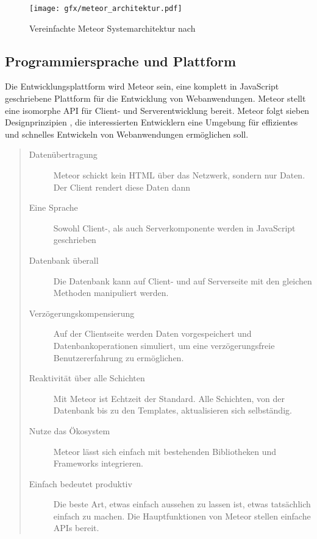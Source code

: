 \begin{figure}[h]
  \texttt{[image: gfx/meteor\_architektur.pdf]}
  \caption{Vereinfachte Meteor Systemarchitektur nach \cite{meteor-architecture}}
  \label{fig:MeteorArchitektur}
\end{figure}

\subsection{Programmiersprache und Plattform}

Die Entwicklungsplattform wird Meteor sein, eine komplett in JavaScript
geschriebene Plattform für die Entwicklung von Webanwendungen. Meteor stellt
eine isomorphe API für Client- und Serverentwicklung bereit. Meteor folgt sieben
Designprinzipien \cite{meteor-7}, die interessierten Entwicklern eine Umgebung
für effizientes und schnelles Entwickeln von Webanwendungen ermöglichen soll.

\begin{quotation}

  \begin{description}

    \item[Datenübertragung]{Meteor schickt kein HTML über das Netzwerk, sondern
    nur Daten. Der Client rendert diese Daten dann}

    \item[Eine Sprache]{Sowohl Client-, als auch Serverkomponente werden in
    JavaScript geschrieben}

    \item[Datenbank überall]{Die Datenbank kann auf Client- und auf Serverseite
    mit den gleichen Methoden manipuliert werden.}

    \item[Verzögerungskompensierung]{Auf der Clientseite werden Daten
    vorgespeichert und Datenbankoperationen simuliert, um eine verzögerungsfreie
    Benutzererfahrung zu ermöglichen.}

    \item[Reaktivität über alle Schichten]{Mit Meteor ist Echtzeit der Standard.
    Alle Schichten, von der Datenbank bis zu den Templates, aktualisieren sich
    selbständig.}

    \item[Nutze das Ökosystem]{Meteor lässt sich einfach mit bestehenden
    Bibliotheken und Frameworks integrieren.}

    \item[Einfach bedeutet produktiv]{Die beste Art, etwas einfach aussehen zu
    lassen ist, etwas tatsächlich einfach zu machen. Die Hauptfunktionen von
    Meteor stellen einfache APIs bereit.}

  \end{description}

\end{quotation}

